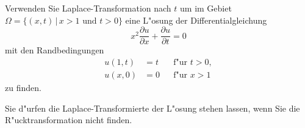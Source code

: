 Verwenden Sie Laplace-Transformation nach $t$ um
im Gebiet $\Omega=\{(x,t)\,|\, x > 1 \text{ und } t > 0\}$ eine
L"osung der Differentialgleichung
\begin{equation}
x^2\frac{\partial u}{\partial x}+\frac{\partial u}{\partial t}=0
\label{50000011:dgl}
\end{equation}
mit den Randbedingungen
\begin{equation}
\begin{aligned}
u(1,t)&=t& &\text{f"ur $t>0$},\\
u(x,0)&=0& &\text{f"ur $x > 1$}
\end{aligned}
\label{50000011:rb}
\end{equation}
zu finden.

\begin{hinweis}
Sie d"urfen die Laplace-Transformierte der L"osung stehen lassen, wenn Sie
die R"ucktransformation nicht finden.
\end{hinweis}

